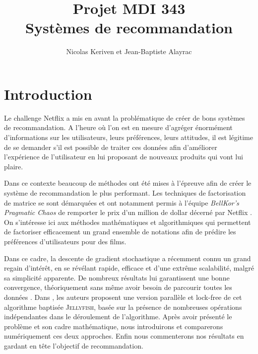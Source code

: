 \documentclass[10pt,a4paper]{article}
\title{Projet MDI 343 \\
Systèmes de recommandation}
\author{Nicolas Keriven et Jean-Baptiste Alayrac}
\begin{document}
\maketitle

\hrulefill
\vspace{2cm}

\newcommand{\jel}{\textsc{Jellyfish} }
\renewcommand{\tablename}{TABLEAU}

%
%


\newpage
\tableofcontents

\section*{Introduction}
 
 Le challenge Netflix a mis en avant la problématique de créer de bons systèmes de recommandation. A l'heure où l'on est en mesure d'agréger énormément d'informations sur les utilisateurs, leurs préférences, leurs attitudes, il est légitime de se demander s'il est possible de traiter ces données afin d'améliorer l'expérience de l'utilisateur en lui proposant de nouveaux produits qui vont lui plaire.
 
 Dans ce contexte beaucoup de méthodes ont été mises à l'épreuve afin de créer le système de recommandation le plus performant. Les techniques de factorisation de matrice se sont démarquées et ont notamment permis à l'équipe \textit{BellKor's Pragmatic Chaos} de remporter le prix d'un million de dollar décerné par Netflix \cite{koren}. On s'intéresse ici aux méthodes mathématiques et algorithmiques qui permettent de factoriser efficacement un grand ensemble de notations afin de prédire les préférences d'utilisateurs pour des films.
 
Dans ce cadre, la descente de gradient stochastique \cite{bottouSGD} a récemment connu un grand regain d'intérêt, en se révélant rapide, efficace et d'une extrême scalabilité, malgré sa simplicité apparente. De nombreux résultats lui garantissent une bonne convergence, théoriquement sans même avoir besoin de parcourir toutes les données \cite{bottou}. Dans \cite{jelly}, les auteurs proposent une version parallèle et lock-free de cet algorithme baptisée \textsc{Jellyfish}, basée sur la présence de nombreuses opérations indépendantes dans le déroulement de l'algorithme. Après avoir présenté le problème et son cadre mathématique, nous introduirons et comparerons numériquement ces deux approches. Enfin nous commenterons nos résultats en gardant en tête l'objectif de recommandation.
\newpage
\end{document}
